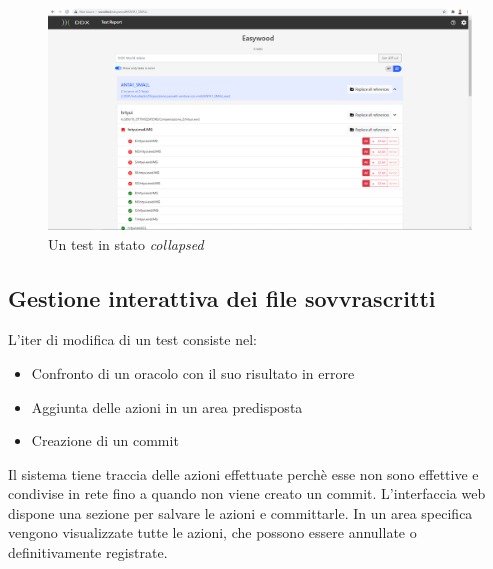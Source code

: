             \begin{figure}
                \includegraphics{images/collpapsed.png}
                \caption{Un test in stato \textit{collapsed}}
            \end{figure}
            
            \subsection{Gestione interattiva dei file sovvrascritti}
            L'iter di modifica di un test consiste nel: 
            \begin{itemize}
                \item Confronto di un oracolo con il suo risultato in errore
                \item Aggiunta delle azioni in un area predisposta
                \item Creazione di un commit
            \end{itemize}      
            Il sistema tiene traccia delle azioni effettuate perchè esse non sono effettive e condivise in rete fino a quando non viene creato un commit.
            L'interfaccia web dispone una sezione per salvare le azioni e committarle.
            In un area specifica vengono visualizzate tutte le azioni, che possono essere annullate o definitivamente registrate.
